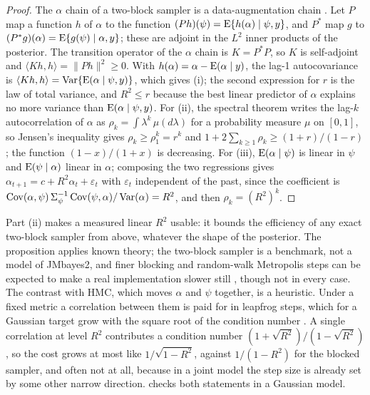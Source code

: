 \begin{proof}
The $\alpha$ chain of a two-block sampler is a data-augmentation chain
\citep{liu1994}. Let $P$ map a function $h$ of $\alpha$ to the function
$(Ph)(\psi) = \mathrm{E}\{h(\alpha) \mid \psi, y\}$, and $P^{*}$ map $g$ to
$(P^{*}g)(\alpha) = \mathrm{E}\{g(\psi) \mid \alpha, y\}$; these are adjoint in
the $L^2$ inner products of the posterior. The transition operator of the
$\alpha$ chain is $K = P^{*}P$, so $K$ is self-adjoint and $\langle Kh, h
\rangle = \|Ph\|^2 \geq 0$. With $h(\alpha) = \alpha - \mathrm{E}(\alpha \mid y)$,
the lag-1 autocovariance is $\langle Kh, h \rangle = \operatorname{Var}\{\mathrm{E}(\alpha \mid
\psi, y)\}$, which gives (i); the second
expression for $r$ is the law of total variance, and $R^2 \leq r$ because
the best linear predictor of $\alpha$ explains no more variance than
$\mathrm{E}(\alpha \mid \psi, y)$. For (ii), the spectral theorem writes the
lag-$k$ autocorrelation of $\alpha$ as $\rho_k = \int \lambda^k\,
\mu(d\lambda)$ for a probability measure $\mu$ on $[0, 1]$, so Jensen's
inequality gives $\rho_k \geq \rho_1^k = r^k$ and $1 + 2\sum_{k \geq 1}
\rho_k \geq (1 + r)/(1 - r)$; the function $(1 - x)/(1 + x)$ is
decreasing. For (iii), $\mathrm{E}(\alpha \mid \psi)$ is linear in $\psi$ and
$\mathrm{E}(\psi \mid \alpha)$ linear in $\alpha$; composing the two regressions
gives $\alpha_{t+1} = c + R^2 \alpha_t + \varepsilon_t$ with
$\varepsilon_t$ independent of the past, since the coefficient is
$\operatorname{Cov}(\alpha, \psi)\,\Sigma_\psi^{-1}
\operatorname{Cov}(\psi, \alpha) / \operatorname{Var}(\alpha) = R^2$, and then
$\rho_k = (R^2)^k$.
\end{proof}

Part (ii) makes a measured linear $R^2$ usable: it bounds the
efficiency of any exact two-block sampler from above, whatever the shape
of the posterior. The proposition applies known theory; the two-block
sampler is a benchmark, not a model of JMbayes2, and finer blocking and
random-walk Metropolis steps can be expected to make a real implementation
slower still \citep{liu1994,roberts1997}, though not in every case. The
contrast with HMC, which moves $\alpha$ and $\psi$ together, is a
heuristic. Under a fixed metric a correlation between them is paid for in
leapfrog steps, which for a Gaussian target grow with the square root of
the condition number \citep{neal2011}. A single correlation at level $R^2$
contributes a condition number $(1 + \sqrt{R^2})/(1 - \sqrt{R^2})$, so the
cost grows at most like $1/\sqrt{1 - R^2}$, against $1/(1 - R^2)$ for the
blocked sampler, and often not at all, because in a joint model the step
size is already set by some other narrow direction.
 checks both statements in a Gaussian model.

